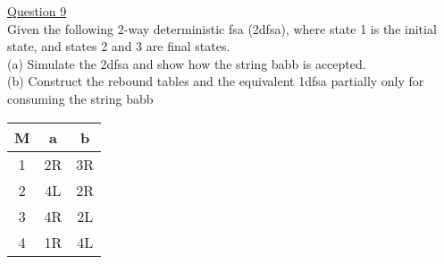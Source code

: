 \documentclass{article}
\begin{document}
\underline{Question 9}\\
Given the following 2-way deterministic fsa (2dfsa), where state 1 is the initial state, 
and states 2 and 3 are final states.\\
(a) Simulate the 2dfsa and show how the string babb is accepted.\\ 
(b) Construct the rebound tables and the equivalent 1dfsa partially only for consuming 
the string babb\\
 \center \begin{tabular}{|c|c|c|}
\hline 
M & a & b\tabularnewline
\hline 
\hline 
1 & 2R& 3R\tabularnewline
\hline 
2 & 4L  & 2R\tabularnewline
\hline 
3 & 4R & 2L \tabularnewline
\hline 
4 & 1R &  4L\tabularnewline
\hline 
\end{tabular}\\
\pagebreak
\end{document}
